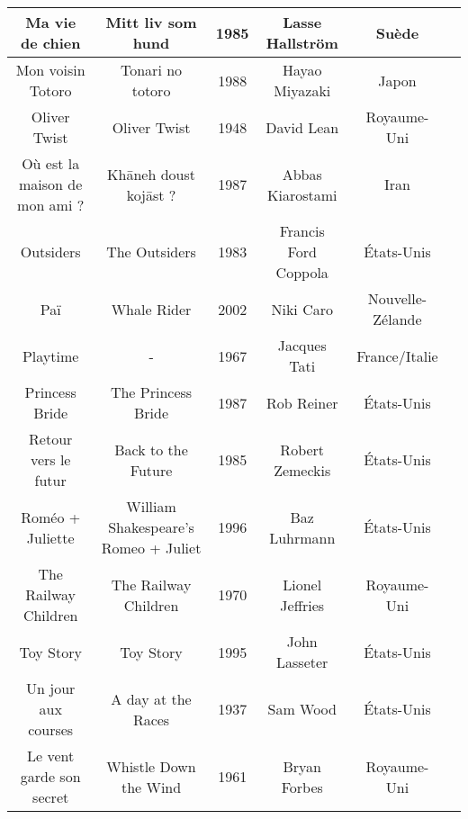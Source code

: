\documentclass[a4paper]{article}
\begin{document}
\begin{tabular}{|c|c|c|c|c|c|}
\hline 
Ma vie de chien & Mitt liv som hund & 1985 & Lasse Hallström & Suède &  \\ 
\hline 
Mon voisin Totoro & Tonari no totoro & 1988 & Hayao Miyazaki & Japon &  \\ 
\hline 
Oliver Twist & Oliver Twist & 1948 & David Lean & Royaume-Uni &  \\ 
\hline 
Où est la maison de mon ami ? & Khāneh doust kojāst ? & 1987 & Abbas Kiarostami & Iran &  \\ 
\hline 
Outsiders & The Outsiders & 1983 & Francis Ford Coppola & États-Unis &  \\ 
\hline 
Paï & Whale Rider & 2002 & Niki Caro & Nouvelle-Zélande &  \\ 
\hline 
Playtime & - & 1967 & Jacques Tati & France/Italie &  \\ 
\hline 
Princess Bride & The Princess Bride & 1987 & Rob Reiner & États-Unis &  \\ 
\hline 
Retour vers le futur & Back to the Future & 1985 & Robert Zemeckis & États-Unis &  \\ 
\hline 
Roméo + Juliette & William Shakespeare's Romeo + Juliet & 1996 & Baz Luhrmann & États-Unis &  \\ 
\hline 
The Railway Children & The Railway Children & 1970 & Lionel Jeffries & Royaume-Uni &  \\ 
\hline 
Toy Story & Toy Story & 1995 & John Lasseter & États-Unis &  \\ 
\hline 
Un jour aux courses & A day at the Races & 1937 & Sam Wood & États-Unis &  \\ 
\hline 
Le vent garde son secret & Whistle Down the Wind & 1961 & Bryan Forbes & Royaume-Uni &  \\ 
\hline 
\end{tabular} 
\thispagestyle{empty}
\end{document}
